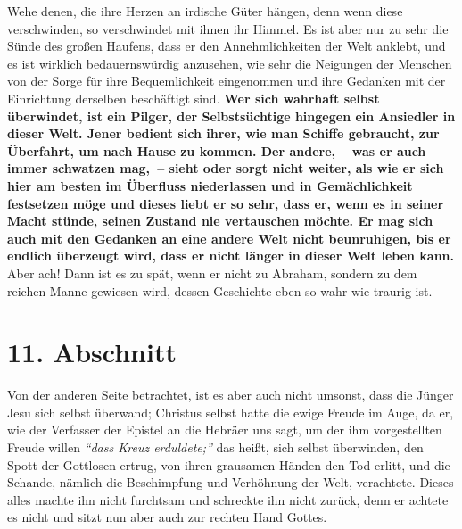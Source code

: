 \label{ref:04_10_pilger}
 Wehe denen, die ihre Herzen an irdische Güter hängen, denn
wenn diese
verschwinden, so verschwindet mit ihnen ihr Himmel. Es ist
aber nur zu sehr die
Sünde des großen Haufens, dass er den Annehmlichkeiten der Welt anklebt, und es
ist wirklich bedauernswürdig anzusehen, wie sehr die Neigungen der Menschen von
der Sorge für ihre Bequemlichkeit eingenommen und ihre Gedanken mit der
Einrichtung derselben beschäftigt sind. \textbf{Wer sich wahrhaft selbst
überwindet, ist
ein Pilger, der Selbstsüchtige hingegen ein Ansiedler
in dieser
Welt. Jener
bedient sich ihrer, wie man Schiffe gebraucht, zur Überfahrt, um nach Hause zu
kommen. Der andere, -- was er auch immer schwatzen mag,~-- sieht oder sorgt
nicht weiter, als wie er sich hier am besten im Überfluss niederlassen und in
Gemächlichkeit festsetzen möge und dieses liebt er so sehr, dass er, wenn es in
seiner Macht stünde, seinen Zustand nie vertauschen möchte. Er mag sich auch mit
den Gedanken an eine andere Welt nicht beunruhigen, bis er endlich überzeugt
wird, dass er nicht länger in dieser Welt leben kann.} Aber ach! Dann ist es zu
spät, wenn er nicht zu Abraham, sondern zu dem reichen Manne gewiesen wird,
dessen Geschichte eben so wahr wie traurig ist.

\section{11. Abschnitt} \label{kap4_ab11}


Von der anderen Seite betrachtet, ist es aber auch nicht umsonst, dass die
Jünger
Jesu sich selbst überwand; Christus selbst hatte die ewige Freude im Auge, da er,
wie der Verfasser der Epistel an die Hebräer uns sagt, um der ihm vorgestellten
Freude willen
\textit{"`dass Kreuz erduldete;"'}
das heißt, sich
selbst überwinden,
den
Spott der Gottlosen ertrug, von ihren grausamen Händen
den Tod erlitt, und die Schande, nämlich die Beschimpfung und Verhöhnung der
Welt, verachtete. Dieses alles machte ihn nicht furchtsam und schreckte ihn
nicht zurück, denn er achtete es nicht und sitzt nun aber auch zur rechten Hand
Gottes.

\medskip

